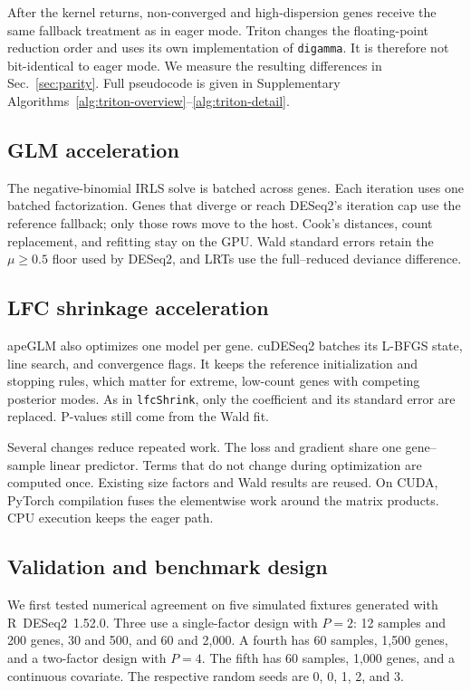 \documentclass[12pt]{article}
\newcommand{\cudeseq}{cuDESeq2}
\begin{document}
After the kernel returns, non-converged and high-dispersion genes receive the
same fallback treatment as in eager mode. Triton changes the floating-point
reduction order and uses its own implementation of \texttt{digamma}. It is
therefore not bit-identical to eager mode. We measure the resulting differences
in Sec.~\ref{sec:parity}. Full pseudocode is given in Supplementary
Algorithms~\ref{alg:triton-overview}--\ref{alg:triton-detail}.

\subsection{GLM acceleration}
\label{sec:glm}
The negative-binomial IRLS solve is batched across genes. Each iteration uses
one batched factorization. Genes that diverge or reach DESeq2's iteration cap
use the reference fallback; only those rows move to the host. Cook's distances,
count replacement, and refitting stay on the GPU. Wald standard errors retain
the $\mu\ge0.5$ floor used by DESeq2, and LRTs use the full--reduced deviance
difference.

\subsection{LFC shrinkage acceleration}
\label{sec:apeglm}
apeGLM \citep{zhu2019apeglm} also optimizes one model per gene. \cudeseq{}
batches its L-BFGS state, line search, and convergence flags. It keeps the
reference initialization and stopping rules, which matter for extreme,
low-count genes with competing posterior modes. As in \texttt{lfcShrink}, only
the coefficient and its standard error are replaced. P-values still come from
the Wald fit.

Several changes reduce repeated work. The loss and gradient share one
gene--sample linear predictor. Terms that do not change during optimization are
computed once. Existing size factors and Wald results are reused. On CUDA,
PyTorch compilation fuses the elementwise work around the matrix products. CPU
execution keeps the eager path.

\subsection{Validation and benchmark design}
\label{sec:parity-method}
We first tested numerical agreement on five simulated fixtures generated with
R~DESeq2~1.52.0. Three use a single-factor design with $P=2$: 12 samples and
200 genes, 30 and 500, and 60 and 2{,}000. A fourth has 60 samples, 1{,}500
genes, and a two-factor design with $P=4$. The fifth has 60 samples, 1{,}000
genes, and a continuous covariate. The respective random seeds are 0, 0, 1, 2,
and 3.
\end{document}

